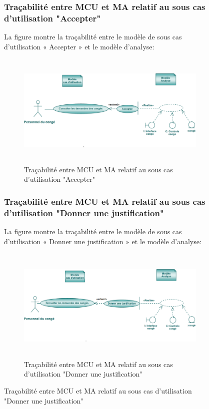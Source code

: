 \documentclass[12 pt]{report}
\begin{document}
\begin{figure}[h]
\begin{center}
\subsubsection{Traçabilité entre MCU et MA relatif au sous cas d’utilisation "Accepter" }
La figure  montre la traçabilité entre le modèle de sous cas d’utilisation « Accepter » et le modèle d’analyse:
\begin{figure}[h]
\begin{center}
\includegraphics[width= 12cm , height =5.5cm]{acc.PNG}
\caption{Traçabilité entre MCU et MA relatif au sous cas d’utilisation "Accepter"}
\end{center}
\end{figure}
\subsubsection{Traçabilité entre MCU et MA relatif au sous cas d’utilisation "Donner une justification" }
La figure  montre la traçabilité entre le modèle de sous cas d’utilisation « Donner une justification » et le modèle d’analyse:
\begin{figure}[h]
\begin{center}
\includegraphics[width= 12cm , height =5.5cm]{don.PNG}
\caption{Traçabilité entre MCU et MA relatif au sous cas d’utilisation "Donner une justification"}
\end{center}
\end{figure}

\end{center}
\end{figure}
\end{document}
